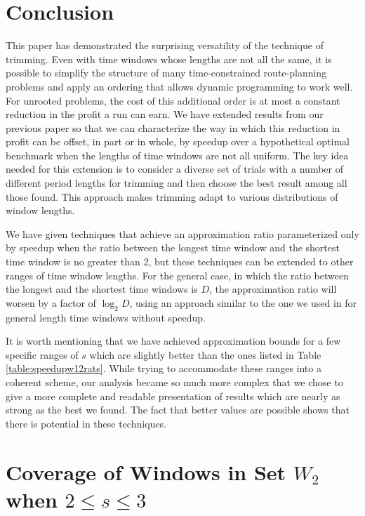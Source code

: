 \documentclass[11pt]{article}
\begin{document}
\section{Conclusion}

This paper has demonstrated the surprising versatility of the technique of trimming. Even with time windows whose lengths are not all the same, it is possible to simplify the structure of many time-constrained route-planning problems and apply an ordering that allows dynamic programming to work well.  For unrooted problems, the cost of this additional order is at most a constant reduction in the profit a run can earn.  We have extended results from our previous paper \cite{Frederickson5} so that we can characterize the way in which this reduction in profit can be offset, in part or in whole, by speedup over a hypothetical optimal benchmark when the lengths of time windows are not all uniform.  The key idea needed for this extension is to consider a diverse set of trials with a number of different period lengths for trimming and then choose the best result among all those found.  This approach makes trimming adapt to various distributions of window lengths.

We have given techniques that achieve an approximation ratio parameterized only by speedup when the ratio between the longest time window and the shortest time window is no greater than 2, but these techniques can be extended to other ranges of time window lengths.  For the general case, in which the ratio between the longest and the shortest time windows is $D$, the approximation ratio will worsen by a factor of $\log_2 D$, using an approach similar to the one we used in \cite{Frederickson6} for general length time windows without speedup.

It is worth mentioning that we have achieved approximation bounds for a few specific ranges of $s$ which are slightly better than the ones listed in Table \ref{table:speedupw12rats}.  While trying to accommodate these ranges into a coherent scheme, our analysis became so much more complex that we chose to give a more complete and readable presentation of results which are nearly as strong as the best we found.  The fact that better values are possible shows that there is potential in these techniques.




\appendix

\section{Coverage of Windows in Set $W_2$ when $2 \leq s \leq 3$}
\label{appendix:2<s<3 W_2}
\end{document}
